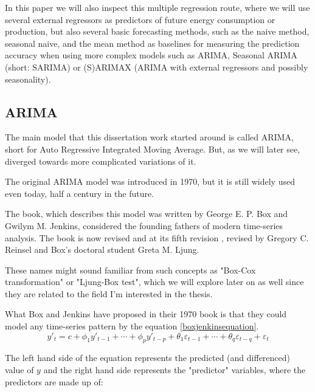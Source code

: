 \documentclass[12pt,a4paper,titlepage]{report}
\begin{document}
In this paper we will also inspect this multiple regression route, where we will use several external regressors as predictors of future energy consumption or production, but also several basic forecasting methods, such as the naive method, seasonal naive, and the mean method as baselines for measuring the prediction accuracy when using more complex models such as ARIMA, Seasonal ARIMA (short: SARIMA) or (S)ARIMAX (ARIMA with external regressors and possibly seasonality).

\subsection{ARIMA} \label{arimasubsection}
The main model that this dissertation work started around is called ARIMA, short for Auto Regressive Integrated Moving Average.
But, as we will later see, diverged towards more complicated variations of it.

The original ARIMA model was introduced in 1970, but it is still widely used even today, half a century in the future.

The book, which describes this model was written by George E. P. Box and Gwilym M. Jenkins, considered the founding fathers of modern time-series analysis. The book is now revised and at its fifth revision \cite{boxjenkins}, revised by Gregory C. Reinsel and Box's doctoral student Greta M. Ljung.

These names might sound familiar from such concepts as "Box-Cox transformation" or "Ljung-Box test", which we will explore later on as well since they are related to the field I'm interested in the thesis.

What Box and Jenkins have proposed in their 1970 book is that they could model any time-series pattern by the equation \ref{boxjenkinsequation}.
\begin{equation}
\label{boxjenkinsequation}
y'_{t} = c + \phi_{1}y'_{t-1} + \cdots + \phi_{p}y'_{t-p} + \theta_{1}\varepsilon_{t-1} + \cdots + \theta_{q}\varepsilon_{t-q} + \varepsilon_{t}
\end{equation}

The left hand side of the equation represents the predicted (and differenced) value of $ y $ and the right hand side represents the "predictor" variables, where the predictors are made up of:
\end{document}
